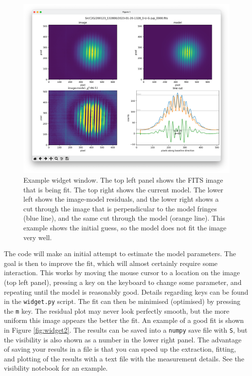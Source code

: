 \documentclass[11pt]{article}
\begin{document}
\begin{figure}[h!]
    \centering
    \includegraphics[width=1\textwidth]{widget.png}
    \caption{Example widget window. The top left panel shows the FITS image that is being fit. The top right shows the current model. The lower left shows the image-model residuals, and the lower right shows a cut through the image that is perpendicular to the model fringes (blue line), and the same cut through the model (orange line). This example shows the initial guess, so the model does not fit the image very well.}
    \label{fig:widget}
\end{figure}

The code will make an initial attempt to estimate the model parameters. The goal is then to improve the fit, which will almost certainly require some interaction. This works by moving the mouse cursor to a location on the image (top left panel), pressing a key on the keyboard to change some parameter, and repeating until the model is reasonably good. Details regarding keys can be found in the \texttt{widget.py} script. The fit can then be minimised (optimised) by pressing the \texttt{m} key. The residual plot may never look perfectly smooth, but the more uniform this image appears the better the fit. An example of a good fit is shown in Figure \ref{fig:widget2}. The results can be saved into a \texttt{numpy} save file with \texttt{S}, but the visibility is also shown as a number in the lower right panel. The advantage of saving your results in a file is that you can speed up the extraction, fitting, and plotting of the results with a text file with the measurement details. See the visibility notebook for an example.
\end{document}
